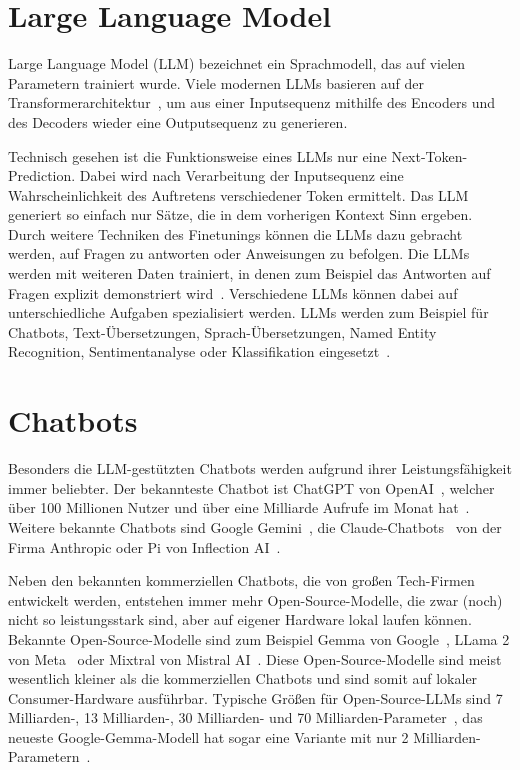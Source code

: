\section{Large Language Model}

Large Language Model (LLM) bezeichnet ein Sprachmodell, das auf vielen Parametern trainiert wurde.
Viele modernen LLMs basieren auf der Transformerarchitektur~\cite{patwardhan2023}, um aus einer Inputsequenz mithilfe des Encoders und des Decoders wieder eine Outputsequenz zu generieren.

Technisch gesehen ist die Funktionsweise eines LLMs nur eine Next-Token-Prediction.
Dabei wird nach Verarbeitung der Inputsequenz eine Wahrscheinlichkeit des Auftretens verschiedener Token ermittelt.
Das LLM generiert so einfach nur Sätze, die in dem vorherigen Kontext Sinn ergeben.
Durch weitere Techniken des Finetunings können die LLMs dazu gebracht werden, auf Fragen zu antworten oder Anweisungen zu befolgen.
Die LLMs werden mit weiteren Daten trainiert, in denen zum Beispiel das Antworten auf Fragen explizit demonstriert wird~\cite{ouyang}.
Verschiedene LLMs können dabei auf unterschiedliche Aufgaben spezialisiert werden.
LLMs werden zum Beispiel für Chatbots, Text-Übersetzungen, Sprach-Übersetzungen, Named Entity Recognition, Sentimentanalyse oder Klassifikation eingesetzt~\cite{patwardhan2023}.

\section{Chatbots}

Besonders die LLM-gestützten Chatbots werden aufgrund ihrer Leistungsfähigkeit immer beliebter.
Der bekannteste Chatbot ist ChatGPT von OpenAI~\cite{chatgpt}, welcher über 100 Millionen Nutzer und über eine Milliarde Aufrufe im Monat hat~\cite{tong2023}.
Weitere bekannte Chatbots sind Google Gemini~\cite{gemini}, die Claude-Chatbots~\cite{claude} von der Firma Anthropic oder Pi von Inflection AI~\cite{pi}.

Neben den bekannten kommerziellen Chatbots, die von großen Tech-Firmen entwickelt werden, entstehen immer mehr Open-Source-Modelle, die zwar (noch) nicht so leistungsstark sind, aber auf eigener Hardware lokal laufen können.
Bekannte Open-Source-Modelle sind zum Beispiel Gemma von Google~\cite{banks2024}, LLama 2 von Meta~\cite{touvron2023} oder Mixtral von Mistral AI~\cite{jiang2024}.
Diese Open-Source-Modelle sind meist wesentlich kleiner als die kommerziellen Chatbots und sind somit auf lokaler Consumer-Hardware ausführbar.
Typische Größen für Open-Source-LLMs sind 7 Milliarden-, 13 Milliarden-, 30 Milliarden- und 70 Milliarden-Parameter~\cite{touvron2023}, das neueste Google-Gemma-Modell hat sogar eine Variante mit nur 2 Milliarden-Parametern~\cite{banks2024}.

